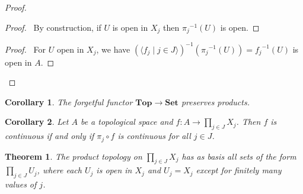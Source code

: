 \documentclass{book}
\newtheorem{thm}[lm]{Theorem}
\newtheorem{cor}{Corollary}[lm]
\theoremstyle{definition}
\newcommand{\inv}[1]{\ensuremath{{#1}^{-1}}}
\newcommand{\Set}{\ensuremath{\mathbf{Set}}}
\newcommand{\Top}{\ensuremath{\mathbf{Top}}}
\begin{document}
  \begin{proof}
    \begin{proof}
      \pf\ By construction, if $U$ is open in $X_j$ then $\inv{\pi_j}(U)$ is 
      open.
    \end{proof}
    \begin{proof}
      \pf\ For $U$ open in $X_j$, we have
      $\inv{(\langle f_j \mid j \in J \rangle)}(\inv{\pi_j}(U)) = \inv{f_j}(U)$ 
      is open in $A$.
    \end{proof}
  \end{proof}
  
  \begin{cor}
    The forgetful functor $\Top \rightarrow \Set$ preserves products.
  \end{cor}
  
  \begin{cor}
    \label{cor:topology:product:continuous}
    Let $A$ be a topological space and $f : A \rightarrow \prod_{j \in J} X_j$. 
    Then $f$ is continuous if and only if $\pi_j \circ f$ is continuous for all 
    $j 
    \in J$.
  \end{cor}
  
  \begin{thm}
    \label{thm:topology:product:basis1}
    The product topology on $\prod_{j \in J} X_j$ has as basis all sets of the 
    form $\prod_{j \in J} U_j$, where each $U_j$ is open in $X_j$ and $U_j = 
    X_j$ 
    except for finitely many values of $j$.
  \end{thm}
  
\end{document}

